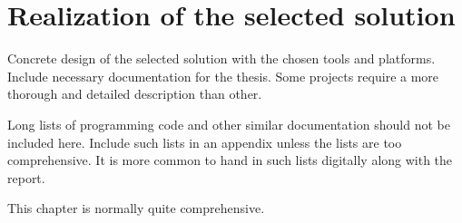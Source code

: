 \section{Realization of the selected solution}
Concrete design of the selected solution with the chosen tools and platforms. Include necessary documentation for the thesis. Some projects require a more thorough and detailed description than other.

Long lists of programming code and other similar documentation should not be included here. Include such lists in an appendix unless the lists are too comprehensive. It is more common to hand in such lists digitally along with the report.

This chapter is normally quite comprehensive.


\pagebreak